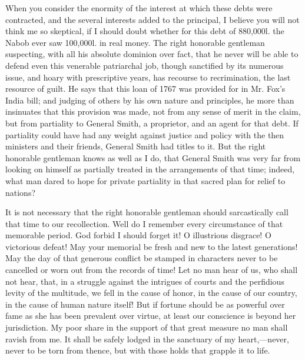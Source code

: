 When you consider the enormity of the interest at which these debts were contracted, and the several interests added to the principal, I believe you will not think me so skeptical, if I should doubt whether for this debt of 880,000l. the Nabob ever saw 100,000l. in real money. The right honorable gentleman suspecting, with all his absolute dominion over fact, that he never will be able to defend even this venerable patriarchal job, though sanctified by its numerous issue, and hoary with prescriptive years, has recourse to recrimination, the last resource of guilt. He says that this loan of 1767 was provided for in Mr. Fox's India bill; and judging of others by his own nature and principles, he more than insinuates that this provision was made, not from any sense of merit in the claim, but from partiality to General Smith, a proprietor, and an agent for that debt. If partiality could have had any weight against justice and policy with the then ministers and their friends, General Smith had titles to it. But the right honorable gentleman knows as well as I do, that General Smith was very far from looking on himself as partially treated in the arrangements of that time; indeed, what man dared to hope for private partiality in that sacred plan for relief to nations?

It is not necessary that the right honorable gentleman should sarcastically call that time to our recollection. Well do I remember every circumstance of that memorable period. God forbid I should forget it! O illustrious disgrace! O victorious defeat! May your memorial be fresh and new to the latest generations! May the day of that generous conflict be stamped in characters never to be cancelled or worn out from the records of time! Let no man hear of us, who shall not hear, that, in a struggle against the intrigues of courts and the perfidious levity of the multitude, we fell in the cause of honor, in the cause of our country, in the cause of human nature itself! But if fortune should be as powerful over fame as she has been prevalent over virtue, at least our conscience is beyond her jurisdiction. My poor share in the support of that great measure no man shall ravish from me. It shall be safely lodged in the sanctuary of my heart,—never, never to be torn from thence, but with those holds that grapple it to life.


